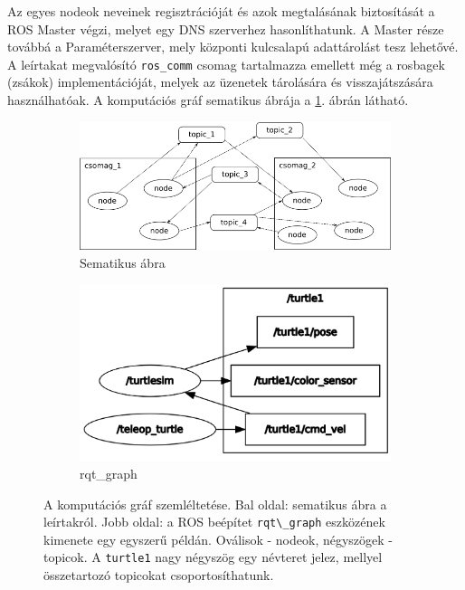 Az egyes nodeok neveinek regisztrációját és azok megtalásának biztosítását a ROS Master végzi, melyet egy DNS szerverhez hasonlíthatunk. A Master része továbbá a Paraméterszerver, mely központi kulcsalapú adattárolást tesz lehetővé. A leírtakat megvalósító \lstinline{ros_comm}\cite{noauthor_ros_comm_nodate} csomag tartalmazza emellett még a rosbagek (zsákok) implementációját, melyek az üzenetek tárolására és visszajátszására használhatóak. A komputációs gráf sematikus ábrája a
\ref{fig:computational_graph}. ábrán látható.

\begin{figure}
    \centering
    \begin{subfigure}[b]{0.45\linewidth}
        \includegraphics[width=\linewidth]{figures/computational_graph.png}
        \caption{Sematikus ábra}
    \end{subfigure}
    \begin{subfigure}[b]{0.45\linewidth}
        \includegraphics[width=\linewidth]{figures/ros_rqt_graph.png}
        \caption{rqt\_graph}
    \end{subfigure}
    \caption{A komputációs gráf szemléltetése. Bal oldal: sematikus ábra a leírtakról. Jobb oldal: a ROS beépítet \lstinline{rqt\_graph} eszközének kimenete egy egyszerű példán. Oválisok - nodeok, négyszögek - topicok. A \lstinline{turtle1} nagy négyszög egy névteret jelez, mellyel összetartozó topicokat csoportosíthatunk.}
    \label{fig:computational_graph}
\end{figure}

